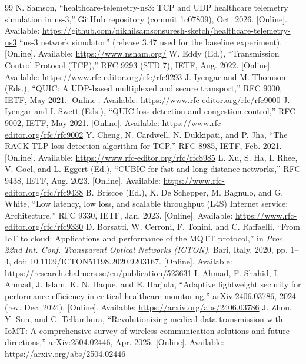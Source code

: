 \documentclass[10pt,twocolumn,letterpaper]{article}
\begin{document}
\begin{thebibliography}{99}
\small
{} N. Samson, ``healthcare-telemetry-ns3: TCP and UDP healthcare telemetry simulation in ns-3,'' GitHub repository (commit 1c07809), Oct. 2026. [Online]. Available: \url{https://github.com/nikhilsamsonsuresh-sketch/healthcare-telemetry-ns3}
 ``ns-3 network simulator'' (release 3.47 used for the baseline experiment). [Online]. Available: \url{https://www.nsnam.org/}
 W. Eddy (Ed.), ``Transmission Control Protocol (TCP),'' RFC 9293 (STD 7), IETF, Aug. 2022. [Online]. Available: \url{https://www.rfc-editor.org/rfc/rfc9293}
 J. Iyengar and M. Thomson (Eds.), ``QUIC: A UDP-based multiplexed and secure transport,'' RFC 9000, IETF, May 2021. [Online]. Available: \url{https://www.rfc-editor.org/rfc/rfc9000}
 J. Iyengar and I. Swett (Eds.), ``QUIC loss detection and congestion control,'' RFC 9002, IETF, May 2021. [Online]. Available: \url{https://www.rfc-editor.org/rfc/rfc9002}
 Y. Cheng, N. Cardwell, N. Dukkipati, and P. Jha, ``The RACK-TLP loss detection algorithm for TCP,'' RFC 8985, IETF, Feb. 2021. [Online]. Available: \url{https://www.rfc-editor.org/rfc/rfc8985}
 L. Xu, S. Ha, I. Rhee, V. Goel, and L. Eggert (Ed.), ``CUBIC for fast and long-distance networks,'' RFC 9438, IETF, Aug. 2023. [Online]. Available: \url{https://www.rfc-editor.org/rfc/rfc9438}
 B. Briscoe (Ed.), K. De Schepper, M. Bagnulo, and G. White, ``Low latency, low loss, and scalable throughput (L4S) Internet service: Architecture,'' RFC 9330, IETF, Jan. 2023. [Online]. Available: \url{https://www.rfc-editor.org/rfc/rfc9330}
 D. Borsatti, W. Cerroni, F. Tonini, and C. Raffaelli, ``From IoT to cloud: Applications and performance of the MQTT protocol,'' in \emph{Proc. 22nd Int. Conf. Transparent Optical Networks (ICTON)}, Bari, Italy, 2020, pp. 1--4, doi: 10.1109/ICTON51198.2020.9203167. [Online]. Available: \url{https://research.chalmers.se/en/publication/523631}
 I. Ahmad, F. Shahid, I. Ahmad, J. Islam, K. N. Haque, and E. Harjula, ``Adaptive lightweight security for performance efficiency in critical healthcare monitoring,'' arXiv:2406.03786, 2024 (rev. Dec. 2024). [Online]. Available: \url{https://arxiv.org/abs/2406.03786}
 J. Zhou, Y. Sun, and C. Tellambura, ``Revolutionizing medical data transmission with IoMT: A comprehensive survey of wireless communication solutions and future directions,'' arXiv:2504.02446, Apr. 2025. [Online]. Available: \url{https://arxiv.org/abs/2504.02446}

\end{thebibliography}
\end{document}
